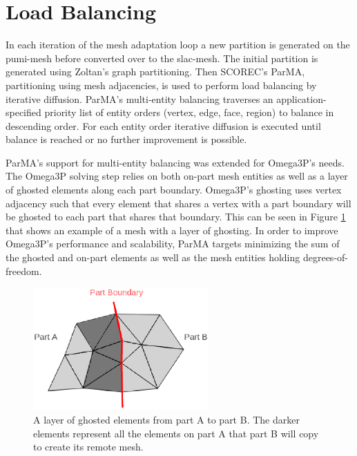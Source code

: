 \documentclass[review,12pt]{elsarticle_summary_report}
\begin{document}



\section{\label{load_balance}Load Balancing}
In each iteration of the mesh adaptation loop a new partition is generated on the
pumi-mesh before converted over to the slac-mesh. The initial partition is generated
using Zoltan's graph partitioning. Then SCOREC's ParMA, partitioning using mesh adjacencies,
is used to perform load balancing by iterative diffusion. ParMA's multi-entity balancing
traverses an application-specified priority list of entity orders (vertex, edge, face,
region) to balance in descending order.
For each entity order iterative diffusion is executed until balance is reached
or no further improvement is possible.

ParMA's support for multi-entity balancing was extended for Omega3P's needs.
The Omega3P solving step relies on both on-part mesh entities as well as a layer
of ghosted elements along each part boundary.
Omega3P's ghosting uses vertex adjacency such that every element that shares a
vertex with a part boundary will be ghosted to each part that shares that
boundary.
This can be seen in Figure \ref{fig:ghost3} that shows an example of a mesh with
a layer of ghosting.
In order to improve Omega3P's performance and scalability, ParMA targets
minimizing the sum of the ghosted and on-part elements as well as the mesh
entities holding degrees-of-freedom.

\begin{figure}[!ph]
\centering
\includegraphics[width=0.6\textwidth]{ghost.eps} 
\caption{\label{fig:ghost3} A layer of ghosted elements from part A to part B. The darker elements represent all the elements on part A that part B will copy to create its remote mesh.}
\end{figure}
\end{document}
